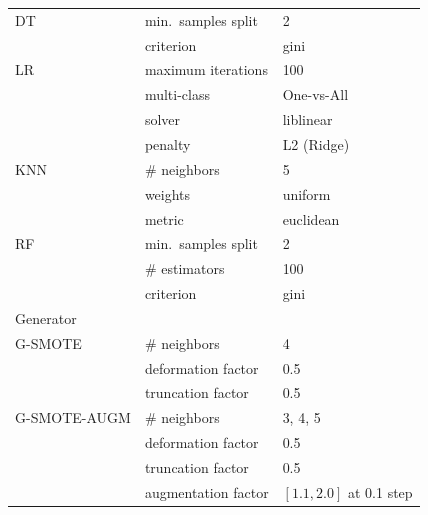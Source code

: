 \documentclass[parskip=full]{scrartcl}
\begin{document}
\begin{table}
\begin{tabular}{lll}
		\midrule
        DT              & min.\ samples split              & 2                              \\
                        & criterion                        & gini                           \\
		LR              & maximum iterations               & 100                            \\
                        & multi-class                      & One-vs-All                     \\
		                & solver                           & liblinear                      \\
                        & penalty                          & L2 (Ridge)                     \\
		KNN             & \# neighbors                     & 5                              \\
                        & weights                          & uniform                        \\
                        & metric                           & euclidean                      \\
		RF              & min.\ samples split              & 2                              \\
		                & \# estimators                    & 100                            \\
                        & criterion                        & gini                           \\
		\toprule
		Generator       &                                  &                                \\
		\midrule
		G-SMOTE         & \# neighbors                     & 4                              \\
                        & deformation factor               & 0.5                            \\
                        & truncation factor                & 0.5                            \\
		G-SMOTE-AUGM    & \# neighbors                     & 3, 4, 5                        \\
                        & deformation factor               & 0.5                            \\
                        & truncation factor                & 0.5                            \\
                        & augmentation factor              & $[1.1, 2.0]$ at 0.1 step       \\
		\bottomrule
	\end{tabular}
\end{table}
 
\end{document}
